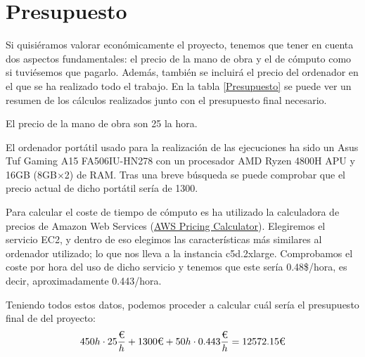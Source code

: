 \section{Presupuesto}

Si quisiéramos valorar económicamente el proyecto, tenemos que tener en cuenta dos aspectos fundamentales: el precio de la mano de obra y el de cómputo como si tuviésemos que pagarlo. 
Además, también se incluirá el precio del ordenador en el que se ha realizado todo el trabajo. 
En la tabla \ref{Presupuesto} se puede ver un resumen de los cálculos realizados junto con el presupuesto final necesario.

El precio de la mano de obra son 25\texteuro\xspace la hora. 

El ordenador portátil usado para la realización de las ejecuciones ha sido un Asus Tuf Gaming A15 FA506IU-HN278 con un procesador AMD\textregistered\xspace Ryzen\texttrademark\xspace 7 4800H APU
y 16GB (8GB$\times$2) de RAM. 
Tras una breve búsqueda se puede comprobar que el precio actual de dicho portátil sería de 1300\texteuro\xspace. 

Para calcular el coste de tiempo de cómputo es ha utilizado la calculadora de precios de Amazon Web Services (\href{https://calculator.aws}{AWS Pricing Calculator}). 
Elegiremos el servicio EC2, y dentro de eso elegimos las características más similares al ordenador utilizado; lo que nos lleva a la instancia c5d.2xlarge. 
Comprobamos el coste por hora del uso de dicho servicio y tenemos que este sería 0.48\$/hora, es decir, aproximadamente 0.443\texteuro /hora.

Teniendo todos estos datos, podemos proceder a calcular cuál sería el presupuesto final de del proyecto:
\begin{equation*}
450h\cdot 25\dfrac{\text{\texteuro}}{h} + 1300\text{\texteuro} + 50h\cdot 0.443\dfrac{\text{\texteuro}}{h} = 12572.15\text{\texteuro}
\end{equation*}


